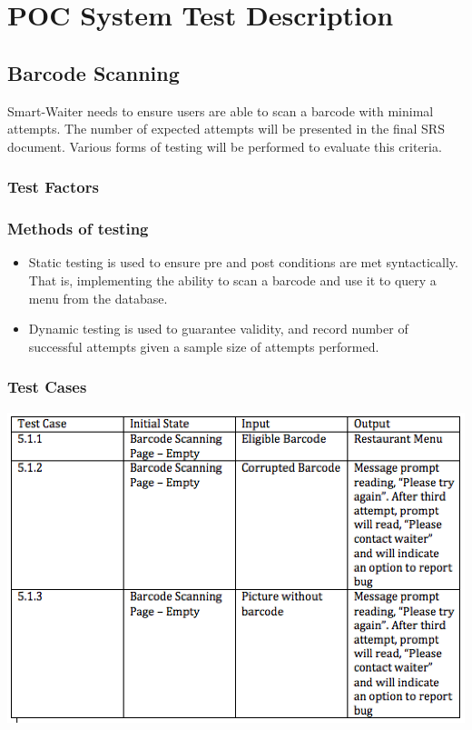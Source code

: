 \documentclass[12pt]{article}
\begin{document}
%
%

\section{POC System Test Description}


\subsection{Barcode Scanning}
Smart-Waiter needs to ensure users are able to scan a barcode with minimal attempts. The number of expected attempts will be presented in the final SRS document. Various forms of testing will be performed to evaluate this criteria.

\subsubsection{Test Factors}

\subsubsection{Methods of testing}
\begin{itemize}
  \item Static testing is used to ensure pre and post conditions are met syntactically. That is, implementing the ability to scan a barcode and use it to query a menu from the database.
  \item Dynamic testing is used to guarantee validity, and record number of successful attempts given a sample size of attempts performed.
\end{itemize}

\subsubsection{Test Cases}
\includegraphics{Barcode.png}
\end{document}
